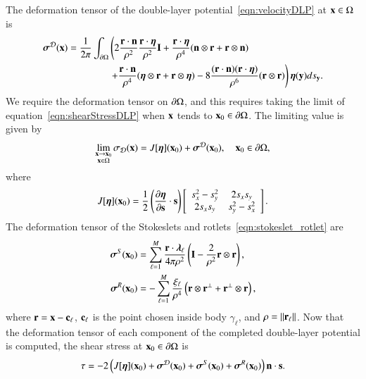 \documentclass[preprint, 10pt]{elsarticle}
\begin{document}
The deformation tensor of the double-layer
potential~\eqref{eqn:velocityDLP} at ${\mathbf{x}} \in \Omega$ is
\begin{equation}
  \label{eqn:shearStressDLP}
  \begin{aligned}
  {\boldsymbol\sigma}^{\mathcal{D}}({\mathbf{x}}) = \frac{1}{2\pi}\int_{{\partial}\Omega} &\left(
    2\frac{{\mathbf{r}} \cdot {\mathbf{n}}}{\rho^2} \frac{{\mathbf{r}} \cdot {\boldsymbol\eta}}{\rho^2} {\mathbf{I}} + 
    \frac{{\mathbf{r}} \cdot {\boldsymbol\eta}}{\rho^4} ({\mathbf{n}} \otimes {\mathbf{r}} + {\mathbf{r}} \otimes {\mathbf{n}}) 
    \right. \\
    &\left.
    +\frac{{\mathbf{r}} \cdot {\mathbf{n}}}{\rho^4} ({\boldsymbol\eta} \otimes {\mathbf{r}} + {\mathbf{r}} \otimes {\boldsymbol\eta}) - 
    8\frac{({\mathbf{r}} \cdot {\mathbf{n}})({\mathbf{r}} \cdot {\boldsymbol\eta})}{\rho^6}({\mathbf{r}} \otimes {\mathbf{r}})
  \right) {\boldsymbol\eta}({\mathbf{y}}) ds_{\mathbf{y}}.
  \end{aligned}
\end{equation}
We require the deformation tensor on ${\partial}\Omega$, and this requires
taking the limit of equation~\eqref{eqn:shearStressDLP} when ${\mathbf{x}}$ tends
to ${\mathbf{x}}_0 \in {\partial}\Omega$.  The limiting value is given
by~\cite{qua-bir2014a}
\begin{align*}
  \lim_{\substack{{\mathbf{x}} \rightarrow {\mathbf{x}}_0 \\ {\mathbf{x}} \in \Omega}}\sigma_{\mathcal{D}}({\mathbf{x}}) =
  J[{\boldsymbol\eta}]({\mathbf{x}}_0) + {\boldsymbol\sigma}^{\mathcal{D}}({\mathbf{x}}_0), \quad {\mathbf{x}}_0 \in {\partial}\Omega,
\end{align*} 
where
\begin{align}
  J[{\boldsymbol\eta}]({\mathbf{x}}_0) = \frac{1}{2}\left(\frac{\partial {\boldsymbol\eta}}{\partial {\mathbf{s}}} 
    \cdot {\mathbf{s}}\right) \left[ 
  \begin{array}{cc}
    s_x^2 - s_y^2 & 2s_x s_y \\ 2s_x s_y & s_y^2 - s_x^2
  \end{array}\right].
  \label{eqn:shearStressJump}
\end{align}
The deformation tensor of the Stokeslets and
rotlets~\eqref{eqn:stokeslet_rotlet} are
\begin{equation}
  \label{eqn:shearStressSR}
  \begin{aligned}
  {\boldsymbol\sigma}^S({\mathbf{x}}_0) &= \sum_{\ell=1}^{M}
    \frac{{\mathbf{r}} \cdot {\boldsymbol\lambda}_\ell}{4\pi\rho^2} \left(
    {\mathbf{I}} - \frac{2}{\rho^2} {\mathbf{r}} \otimes {\mathbf{r}} \right),  \\
  {\boldsymbol\sigma}^R({\mathbf{x}}_0) &= -\sum_{\ell=1}^M
    \frac{\xi_\ell}{\rho^4} \left({\mathbf{r}} \otimes {\mathbf{r}}^\perp + 
    {\mathbf{r}}^\perp \otimes {\mathbf{r}} \right),
  \end{aligned}
\end{equation}
where ${\mathbf{r}} = {\mathbf{x}} - {\mathbf{c}}_\ell$, ${\mathbf{c}}_\ell$ is the point chosen inside body
$\gamma_\ell$, and $\rho = \|{\mathbf{r}}_\ell\|$.  Now that the deformation
tensor of each component of the completed double-layer potential is
computed, the shear stress at ${\mathbf{x}}_0 \in {\partial}\Omega$ is
\begin{align*}
  \tau = -2 \left(J[{\boldsymbol\eta}]({\mathbf{x}}_0) + {\boldsymbol\sigma}^{\mathcal{D}}({\mathbf{x}}_0) + 
    {\boldsymbol\sigma}^S({\mathbf{x}}_0) + {\boldsymbol\sigma}^R({\mathbf{x}}_0)\right) {\mathbf{n}} \cdot {\mathbf{s}}.
\end{align*}
\end{document}
